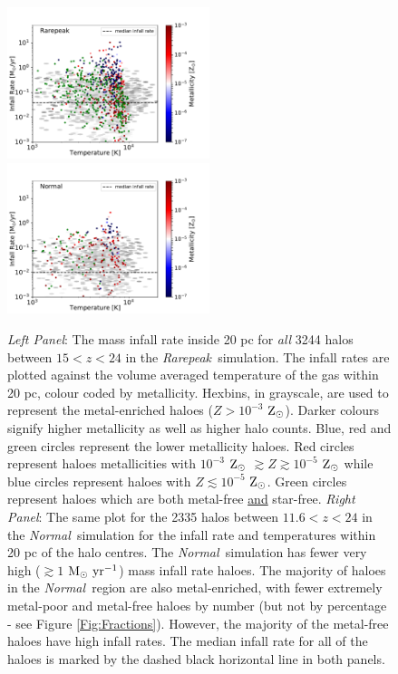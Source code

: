 \documentclass[graphics, twocolumn, usenatbib]{mn2e}
\newcommand{\msolaryrc} {$\rm{M_{\odot}~yr^{-1}}$}
\newcommand{\zsolar} {$\rm{Z_{\odot}}~$}
\newcommand{\zsolarc} {$\rm{Z_{\odot}}$}
\newcommand{\rarepeak} {\textit{Rarepeak~}}
\newcommand{\normal} {\textit{Normal~}}
\begin{document}
\begin{figure}
\centering
\begin{minipage}{175mm}      \begin{center} 
\centerline{
\includegraphics[width=0.525\textwidth]{FIGURES/Rarepeak_MdotTZ.pdf}
\includegraphics[width=0.525\textwidth]{FIGURES/Normal_MdotTZ.pdf}}
\caption{\textit{Left Panel}: The mass infall rate inside 20 pc for \textit{all} 
  3244 halos between $15<z<24$ in 
  the \rarepeak simulation. The infall rates are plotted
  against the volume averaged temperature of the gas within 20 pc, colour coded by metallicity. Hexbins, in
  grayscale, are used to represent the metal-enriched haloes ($Z > 10^{-3}$ \zsolarc).
  Darker colours signify higher metallicity as well as higher halo counts. Blue, red and green circles
  represent the lower metallicity haloes. Red circles represent haloes metallicities
  with $10^{-3} $ \zsolar $\gtrsim Z \gtrsim 10^{-5}$ \zsolar while blue circles represent
  haloes with $Z \lesssim 10^{-5}$ \zsolarc. Green circles represent haloes which are both
  metal-free \underline{and} star-free.  \textit{Right Panel}: The same plot for the 2335 halos between $11.6<z<24$ in the \normal simulation
  for the infall rate and temperatures within 20 pc of the halo centres.
  The \normal simulation has fewer very high ($ \gtrsim 1 $ \msolaryrc) mass infall rate haloes.
  The majority of haloes in the \normal region are also metal-enriched, with fewer extremely metal-poor and
  metal-free haloes by number (but not by percentage - see Figure \ref{Fig:Fractions}).
  However, the majority of the metal-free haloes have high infall rates. 
  The median infall rate for all of the haloes is marked by the dashed 
  black horizontal line in both panels.}
  \label{Fig:Scatter}
\end{center} \end{minipage}

\end{figure}
\end{document}

